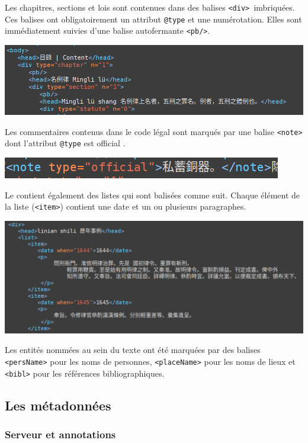 Les chapitres, sections et lois sont contenues dans des balises \texttt{<div> }imbriquées. Ces balises ont obligatoirement un attribut \texttt{@type} et une numérotation. Elles sont immédiatement suivies d’une balise autofermante \texttt{<pb/>}.

\noindent \includegraphics[width=\textwidth]{images/annexe3.png}

Les commentaires contenus dans le code légal sont marqués par une balise \texttt{<note>} dont l’attribut \texttt{@type} est \og official \fg. 

\noindent \includegraphics[width=\textwidth]{images/annexe4.png}

Le \huidian contient également des listes qui sont balisées comme suit. Chaque élément de la liste (\texttt{<item>}) contient une date et un ou plusieurs paragraphes. 

\noindent \includegraphics[width=\textwidth]{images/annexe5.png}

Les entités nommées au sein du texte ont été marquées par des balises \texttt{<persName>} pour les noms de personnes, \texttt{<placeName>} pour les noms de lieux et \texttt{<bibl>} pour les références bibliographiques. 

\subsection*{Les métadonnées \IIIF}
\subsubsection{Serveur \IIIF et annotations}

